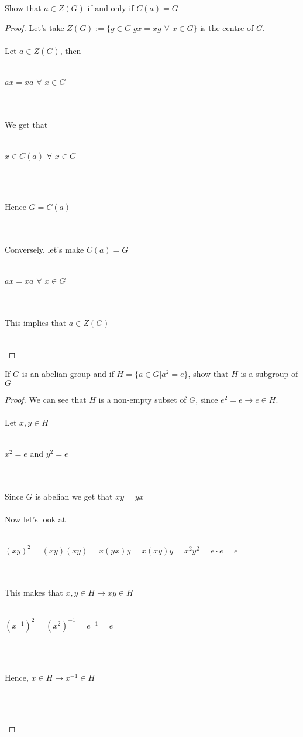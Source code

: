 \documentclass[12pt]{article}
\newenvironment{problem}[2][Problem]{\begin{trivlist}
\item[\hskip \labelsep {\bfseries #1}\hskip \labelsep {\bfseries #2.}]}{\end{trivlist}}
\begin{document}
 \begin{problem}{2.3.6}
Show that $a \in Z(G)$ if and only if $C(a) = G$
\end{problem}

\begin{proof}
Let's take $Z(G) := \{g\in G | gx = xg$ $\forall$ $x\in G\}$ is the centre of $G$. \\ \\
Let $a \in Z(G)$, then \\ \\
\centerline{$ax=xa$ $\forall$ $x\in G$} \\ \\
We get that \\ \\
\centerline{$x \in C(a)$ $\forall$ $x\in G$} \\ \\
\centerline{Hence $G = C(a)$} \\ \\
Conversely, let's make $C(a) = G$ \\ \\
\centerline{$ax=xa$ $\forall$ $x\in G$} \\ \\
This implies that $a\in Z(G)$ \\ \\
\centerline{}
\end{proof}

\begin{problem}{2.3.8}
If $G$ is an abelian group and if $H = \{ a \in G | a^2 =e \}$, show that $H$ is a subgroup of $G$
\end{problem}

\begin{proof}
We can see that $H$ is a non-empty subset of $G$, since $e^2 = e \rightarrow e \in H$. \\ \\
Let $x,y \in H$ \\ \\ 
\centerline{$x^2 = e$ and $y^2 = e$} \\ \\
Since $G$ is abelian we get that $xy = yx$ \\ \\
Now let's look at  \\ \\
\centerline{$(xy)^2=(xy)(xy)=x(yx)y=x(xy)y=x^2y^2=e \cdot e=e$} \\ \\
This makes that $x,y \in H \rightarrow xy \in H$ \\ \\
\centerline{$(x^{-1})^2=(x^2)^{-1}=e^{-1}=e$} \\ \\
\centerline{Hence, $x \in H \rightarrow x^{-1} \in H$} \\ \\
\centerline{}


\end{proof}



 
\end{document}
